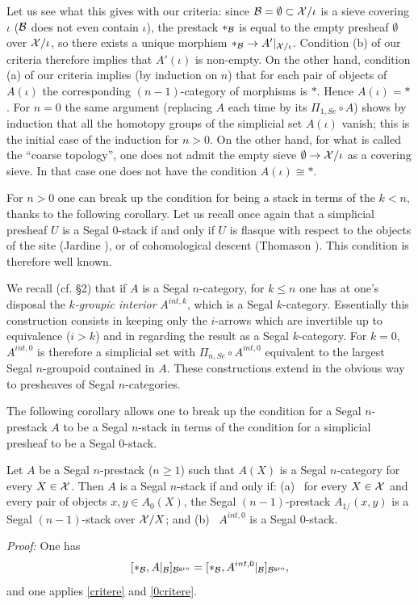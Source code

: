 Let us see what this gives with our criteria: since
${\cal B} = \emptyset \subset {\cal X} /\iota$ is a sieve covering $\iota$ (${\cal B}$ does
not even contain $\iota$), the prestack $\ast _{{\cal B}}$ is equal to the empty
presheaf $\emptyset$ over ${\cal X} /\iota$, so there exists a unique morphism
$\ast _{{\cal B}}\rightarrow A'|_{{\cal X} /\iota}$. Condition (b) of our criteria
therefore implies that $A'(\iota )$ is non-empty. On the other hand, condition
(a) of our criteria implies (by induction on $n$) that for each pair of
objects of $A(\iota )$ the corresponding $(n-1)$-category of morphisms is
$\ast$. Hence $A(\iota )=\ast$.
For $n=0$ the same argument (replacing $A$ each time by its
$\Pi _{1,Se}\circ A$) shows by induction that all the homotopy groups of the
simplicial set $A(\iota )$ vanish; this is the initial case of the induction
for $n>0$.
On the other hand, for what is called the ``coarse topology'', one does not
admit the empty sieve $\emptyset \rightarrow {\cal X} /\iota$ as a covering sieve.
In that case one does not have the condition $A(\iota )\cong \ast$.





For $n>0$ one can break up the condition for being a stack in terms of the
$k<n$, thanks to the following corollary. Let us recall once again that a
simplicial presheaf $U$ is a Segal $0$-stack if and only if $U$ is flasque with
respect to the objects of the site (Jardine \cite{Jardine}), or of
cohomological descent (Thomason \cite{Thomason} \cite{TravauxThomason}). This
condition is therefore well known.

We recall (cf. \S 2) that if $A$ is a Segal $n$-category, for $k\leq n$ one
has at one's disposal the {\em $k$-groupic interior} $A^{int, k}$, which is a
Segal $k$-category. Essentially this construction consists in keeping only the
$i$-arrows which are invertible up to equivalence ($i>k$) and in regarding the
result as a Segal $k$-category. For $k=0$, $A^{int, 0}$ is therefore a
simplicial set with $\Pi _{n,Se}\circ A^{int, 0}$ equivalent to the largest
Segal $n$-groupoid contained in $A$. These constructions extend in the
obvious way to presheaves of Segal $n$-categories.

The following corollary allows one to break up the condition for a Segal
$n$-prestack $A$ to be a Segal $n$-stack in terms of the condition for a
simplicial presheaf to be a Segal $0$-stack.



\begin{corollary}
\label{devissage}
Let $A$ be a Segal $n$-prestack ($n\geq 1$) such that $A(X)$ is a Segal
$n$-category for every $X\in {\cal X}$. Then $A$ is a Segal $n$-stack if and only
if:
\newline
(a) \, for every $X\in {\cal X}$ and every pair of objects $x,y\in A_0(X)$, the
Segal $(n-1)$-prestack $A_{1/}(x,y)$ is a Segal $(n-1)$-stack over
${\cal X} /X$; and
\newline
(b) \, $A^{int, 0}$ is a Segal $0$-stack.
\end{corollary}
{\em Proof:}
One has
$$
[\ast _{{\cal B}}, A|_{{\cal B}}]_{{\cal B} ^{\rm gro}} =
[\ast _{{\cal B}}, A^{int, 0}|_{{\cal B}}]_{{\cal B} ^{\rm gro}} ,
$$
and one applies \ref{critere} and \ref{0critere}.
\eop


